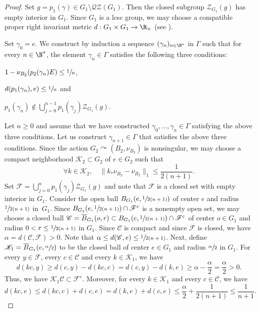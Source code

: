 \begin{proof}
Set $g = p_1(\gamma) \in G_1\setminus \mathscr{Q}\mathscr{Z}(G_1)$. Then the closed subgroup $\mathscr Z_{G_1}(g)$ has empty interior in $G_1$. Since $G_1$ is a lcsc group, we may choose a compatible proper right invariant metric $d : G_1 \times G_1 \to \R_+$ (see \eg \cite{St73}).

Set $\gamma_0 = e$. We construct by induction a sequence $(\gamma_n)_{n \in \N^*}$ in $\Gamma$ such that for every $n \in \N^*$, the element $\gamma_n \in \Gamma$ satisfies the following three conditions:
\begin{enumeratei}
\item
$1 - \nu_{B_2}(p_2(\gamma_n) E) \leq \sfrac{1}{n}$,
\item
$d(p_1(\gamma_n), e) \leq \sfrac{1}{n}$ and
\item
$p_1(\gamma_{n}) \notin \bigcup_{j = 0}^{n - 1} p_1(\gamma_j)\mathscr Z_{G_1}(g)$.
\end{enumeratei}
Let $n \geq 0$ and assume that we have constructed $\gamma_0, \dots, \gamma_n \in \Gamma$ satisfying the above three conditions. Let us construct $\gamma_{n + 1} \in \Gamma$ that satisfies the above three conditions. Since the action $G_2 \curvearrowright (B_2, \nu_{B_2})$ is nonsingular, we may choose a compact neighborhood $\mathscr K_2 \subset G_2$ of $e \in G_2$ such that
\[
\forall k \in \mathscr K_2, \quad \|{k}_\ast \nu_{B_2} - \nu_{B_2}\|_{1} \leq \frac{1}{2(n + 1)}.
\]
Set $\mathscr F = \bigcup_{j = 0}^n p_1(\gamma_j)\mathscr Z_{G_1}(g)$ and note that $\mathscr F$ is a closed set with empty interior in $G_1$. Consider the open ball $B_{G_1}(e, \sfrac{1}{2(n + 1)})$ of center $e$ and radius $\sfrac{1}{2(n + 1)}$ in~$G_1$. Since $B_{G_1}(e, \sfrac{1}{2(n + 1)}) \cap \mathscr F^c$ is a nonempty open set, we may choose a closed ball $\mathscr C = \overline B_{G_1}(o, r) \subset B_{G_1}(e, \sfrac{1}{2(n + 1)}) \cap \mathscr F^c$ of center $o \in G_1$ and radius $0 < r \leq \sfrac{1}{2(n + 1)}$ in $G_1$. Since $\mathscr C$ is compact and since $\mathscr F$ is closed, we have $\alpha = d(\mathscr C , \mathscr F) > 0$. Note that $\alpha \leq d(\mathscr C, e) \leq \sfrac{1}{2(n + 1)}$. Next, define $\mathscr K_1 = \overline B_{G_1}(e, \sfrac{\alpha}{2})$ to be the closed ball of center $e \in G_1$ and radius $\sfrac{\alpha}{2}$ in $G_1$. For every $y \in \mathscr F$, every $c \in \mathscr C$ and every $k \in \mathscr K_1$, we have
\[
d(kc, y) \geq d(c, y) - d(kc, c) = d(c, y) - d(k, e) \geq \alpha - \frac{\alpha}{2} = \frac{\alpha}{2} > 0.
\]
Thus, we have $\mathscr K_1 \mathscr C \subset \mathscr F^c$. Moreover, for every $k \in \mathscr K_1$ and every $c \in \mathscr C$, we have
\[
d(kc, e) \leq d(kc, c) + d(c, e) = d(k, e) + d(c, e) \leq \frac{\alpha}{2} + \frac{1}{2(n + 1)} \leq \frac{1}{n + 1}.
\]


\end{proof}
